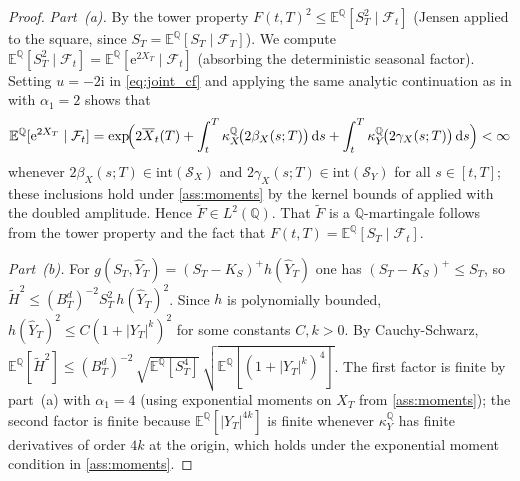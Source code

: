 \documentclass[10pt,a4paper,reqno]{amsart}
\newcommand{\E}{\mathbb{E}}
\newcommand{\Q}{\mathbb{Q}}
\newcommand{\F}{\mathcal{F}}
\newcommand{\1}{\mathbbm{1}}
\newcommand{\dd}{\mathrm{d}}
\newcommand{\ii}{\mathrm{i}}
\newcommand{\ee}{\mathrm{e}}
\begin{document}
\begin{proof}
\emph{Part~(a).}
By the tower property $F(t,T)^2 \le \E^\Q[S_T^2\mid\F_t]$ (Jensen applied to
the square, since $S_T = \E^\Q[S_T\mid\F_T]$).
We compute $\E^\Q[S_T^2\mid\F_t] = \E^\Q[\ee^{2X_T}\mid\F_t]$ (absorbing the
deterministic seasonal factor).
Setting $u = -2\ii$ in \eqref{eq:joint_cf} and applying the same analytic
continuation as in  with $\alpha_1 = 2$ shows that
$$
  \E^\Q[\ee^{2X_T}\mid\F_t]
  = \exp\!\Bigl(
      2\overline{X}_t(T)
      + \int_t^T \kappa_X^\Q\!\bigl(2\beta_X(s;T)\bigr)\,\dd s
      + \int_t^T \kappa_Y^\Q\!\bigl(2\gamma_X(s;T)\bigr)\,\dd s
    \Bigr) < \infty
$$
whenever $2\beta_X(s;T) \in \mathrm{int}(\mathcal{S}_X)$ and
$2\gamma_X(s;T) \in \mathrm{int}(\mathcal{S}_Y)$ for all $s \in [t,T]$;
these inclusions hold under \ref{ass:moments} by the
kernel bounds of  applied with the doubled amplitude.
Hence $\widetilde{F} \in L^2(\Q)$.
That $\widetilde{F}$ is a $\Q$-martingale follows from the tower property
and the fact that $F(t,T) = \E^\Q[S_T\mid\F_t]$.

\emph{Part~(b).}
For $g(S_T,\widehat{Y}_T) = (S_T-K_S)^+h(\widehat{Y}_T)$ one has
$(S_T-K_S)^+ \le S_T$, so
$\widetilde{H}^2 \le (B_T^d)^{-2} S_T^2\,h(\widehat{Y}_T)^2$.
Since $h$ is polynomially bounded, $h(\widehat{Y}_T)^2 \le C(1 + |Y_T|^k)^2$
for some constants $C,k > 0$.
By Cauchy-Schwarz,
$\E^\Q[\widetilde{H}^2] \le (B_T^d)^{-2}\,\sqrt{\E^\Q[S_T^4]}\,
  \sqrt{\E^\Q[(1+|Y_T|^k)^4]}$.
The first factor is finite by part~(a) with $\alpha_1 = 4$ (using exponential
moments on $X_T$ from \ref{ass:moments}); the second
factor is finite because $\E^\Q[|Y_T|^{4k}]$ is finite whenever $\kappa_Y^\Q$
has finite derivatives of order $4k$ at the origin, which holds under the
exponential moment condition in \ref{ass:moments}.
\end{proof}
\end{document}
